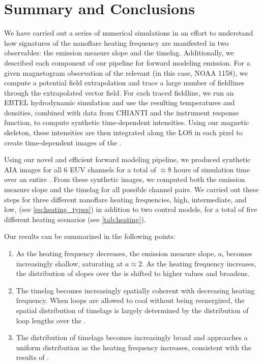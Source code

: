 \section{Summary and Conclusions}\label{conclusions}

We have carried out a series of numerical simulations in an effort to understand how signatures of the nanoflare heating frequency are manifested in two observables: the emission measure slope and the timelag. Additionally, we described each component of our pipeline for forward modeling \AR{} emission. For a given magnetogram observation of the relevant \AR{} (in this case, NOAA 1158), we compute a potential field extrapolation and trace a large number of fieldlines through the extrapolated vector field. For each traced fieldline, we run an EBTEL hydrodynamic simulation and use the resulting temperatures and densities, combined with data from CHIANTI and the instrument response function, to compute synthetic time-dependent intensities. Using our magnetic skeleton, these intensities are then integrated along the LOS in each pixel to create time-dependent images of the \AR{}.

Using our novel and efficient forward modeling pipeline, we produced synthetic AIA images for all 6 EUV channels for a total of $\approx8$ hours of simulation time over an entire \AR{}. From these synthetic images, we computed both the emission measure slope and the timelag for all possible channel pairs. We carried out these steps for three different nanoflare heating frequencies, high, intermediate, and low, (see \autoref{eq:heating_types}) in addition to two control models, for a total of five different heating scenarios (see \autoref{tab:heating}).

Our results can be summarized in the following points:
\begin{enumerate}
    \item As the heating frequency decreases, the emission measure slope, $a$, becomes increasingly shallow, saturating at $a\approx2$. As the heating frequency increases, the distribution of slopes over the \AR{} is shifted to higher values and broadens.
    \item The timelag becomes increasingly spatially coherent with decreasing heating frequency. When loops are allowed to cool without being reenergized, the spatial distribution of timelags is largely determined by the distribution of loop lengths over the \AR{}.
    \item The distribution of timelags becomes increasingly broad and approaches a uniform distribution as the heating frequency increases, consistent with the results of \citet{viall_signatures_2016}.
\end{enumerate}

